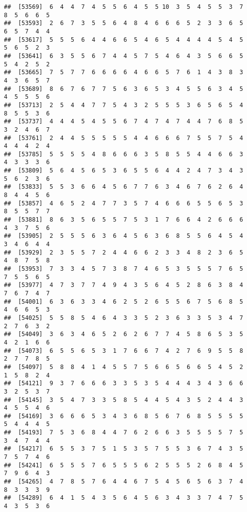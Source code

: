 \documentclass[
]{book}
\begin{document}
\begin{verbatim}
##  [53569]  6  4  4  7  4  5  5  6  4  5  5 10  3  5  4  5  5  3  7  8  5  6  6  5
##  [53593]  2  6  7  3  5  5  6  4  8  4  6  6  6  5  2  3  3  6  5  6  5  7  4  4
##  [53617]  5  5  5  6  4  4  6  6  5  4  6  5  4  4  4  4  5  4  5  5  6  5  2  3
##  [53641]  6  3  5  5  6  7  4  4  5  7  5  4  6  4  3  5  6  6  5  5  4  2  5  2
##  [53665]  7  5  7  7  6  6  6  6  4  6  6  5  7  6  1  4  3  8  3  4  3  6  5  7
##  [53689]  8  6  7  6  7  7  5  6  3  6  5  3  4  5  5  6  3  4  5  4  5  5  5  6
##  [53713]  2  5  4  4  7  7  5  4  3  2  5  5  5  3  6  5  6  5  4  8  5  5  3  6
##  [53737]  4  4  4  5  4  5  5  6  7  4  7  4  7  4  4  7  6  8  5  3  2  4  6  7
##  [53761]  2  4  4  5  5  5  5  5  4  4  6  6  6  7  5  5  7  5  4  4  4  4  2  4
##  [53785]  5  5  5  5  4  8  6  6  6  3  5  8  5  5  4  4  6  6  3  4  3  3  3  6
##  [53809]  5  6  4  5  6  5  3  6  5  5  6  4  4  2  4  7  3  4  3  5  6  2  3  6
##  [53833]  5  5  3  6  6  4  5  6  7  7  6  3  4  6  7  6  2  6  4  8  4  4  5  6
##  [53857]  4  6  5  2  4  7  7  3  5  7  4  6  6  6  5  5  6  5  3  8  5  5  7  7
##  [53881]  8  6  3  5  6  5  5  7  5  3  1  7  6  6  4  2  6  6  6  4  3  7  5  6
##  [53905]  2  5  5  5  6  3  6  4  5  6  3  6  8  5  5  6  4  5  4  3  4  6  4  4
##  [53929]  2  3  5  5  7  2  4  4  6  6  2  3  3  4  8  2  3  6  5  4  8  7  5  8
##  [53953]  7  3  3  4  5  7  3  8  7  4  6  5  3  5  5  5  7  6  5  7  5  5  6  5
##  [53977]  4  7  3  7  7  4  9  4  3  5  6  4  5  2  8  6  3  8  4  7  6  7  4  7
##  [54001]  6  3  6  3  3  4  6  2  5  2  6  5  5  6  7  5  6  8  5  4  6  6  5  3
##  [54025]  5  5  8  5  4  6  4  3  3  5  2  3  6  3  3  5  3  4  7  2  7  6  3  2
##  [54049]  3  6  3  4  6  5  2  6  2  6  7  7  4  5  8  6  5  3  5  4  2  1  6  6
##  [54073]  6  5  5  6  5  3  1  7  6  6  7  4  2  7  6  9  5  5  8  2  7  7  8  5
##  [54097]  5  8  8  4  1  4  5  5  7  5  6  6  5  6  6  5  4  5  2  1  5  8  2  4
##  [54121]  9  3  7  6  6  6  3  3  5  3  5  4  4  4  3  4  3  6  6  3  2  5  3  7
##  [54145]  3  5  4  7  3  3  5  8  5  4  4  5  4  3  5  2  4  4  3  4  5  5  4  6
##  [54169]  3  6  6  6  5  3  4  3  6  8  5  6  7  6  8  5  5  5  5  5  4  4  4  5
##  [54193]  7  5  3  6  8  4  4  7  6  2  6  6  3  5  5  5  5  7  5  3  4  7  4  4
##  [54217]  6  5  5  3  7  5  1  5  3  5  7  5  5  3  6  7  4  3  5  7  5  7  4  6
##  [54241]  6  5  5  5  7  6  5  5  5  6  2  5  5  5  2  6  8  4  5  7  9  6  4  3
##  [54265]  4  7  8  5  7  6  4  4  6  7  5  4  5  6  5  6  3  7  4  8  3  3  3  9
##  [54289]  6  4  1  5  4  3  5  6  4  5  6  3  4  3  3  7  4  7  5  4  3  5  3  6

\end{verbatim}
\end{document}
